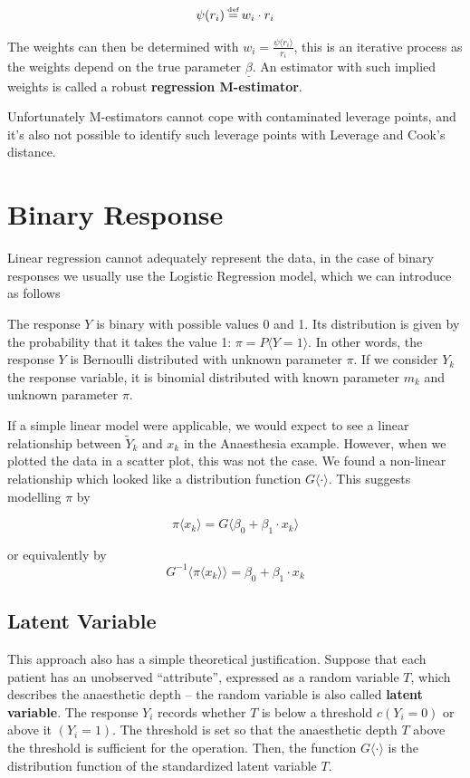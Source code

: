 \documentclass[11pt]{article}
\newcommand\defeq{\mathrel{\overset{\makebox[0pt]{\mbox{\normalfont\tiny def}}}{=}}}
\begin{document}
\begin{equation*}
	\psi(r_i) \defeq w_i \cdot r_i
\end{equation*}

\noindent
The weights can then be determined with $w_i = \frac{\psi\langle r_i \rangle}{r_i}$, this is an iterative process as the weights depend on the true parameter $\underline{\beta}$. An estimator with such implied weights is called a robust \textbf{regression M-estimator}.

\noindent
Unfortunately M-estimators cannot cope with contaminated leverage points, and it's also not possible to identify such leverage points with Leverage and Cook's distance.

\section{Binary Response}

Linear regression cannot adequately represent the data, in the case of binary responses we usually use the Logistic Regression model, which we can introduce as follows

\begin{theorem}
	The response $Y$ is binary with possible values 0 and 1. Its distribution is given by the probability that it takes the value 1: $ \pi = P\langle Y = 1 \rangle$. In other words, the response $Y$ is Bernoulli distributed with unknown parameter $\pi$. If we consider $Y_k$ the response variable, it is binomial distributed with known parameter $m_k$ and unknown parameter $\pi$.
\end{theorem}

If a simple linear model were applicable, we would expect to see a linear relationship between $\tilde{Y}_k$ and $x_k$ in the Anaesthesia example. However, when we plotted the data in a scatter plot, this was not the case. We found a non-linear relationship which looked like a distribution function $G\langle \cdot \rangle$. This suggests modelling $\pi$ by

\begin{equation*}
	\pi\langle x_k \rangle = G\langle \beta_0 + \beta_1 \cdot x_k \rangle
\end{equation*}

\noindent
or equivalently by
\begin{equation*}
	G^{-1}\langle\pi\langle x_k \rangle\rangle = \beta_0 + \beta_1 \cdot x_k
\end{equation*}

\subsection{Latent Variable}
This approach also has a simple theoretical justification. Suppose that each patient has an unobserved “attribute”, expressed as a random variable $T$, which describes the anaesthetic depth – the random variable is also called \textbf{latent variable}. The response $Y_i$ records whether $T$ is below a threshold $c (Y_i = 0)$ or above it $(Y_i = 1)$. The threshold is set so that the anaesthetic depth $T$ above the threshold is sufficient for the operation. Then, the function $G\langle \cdot \rangle$ is the distribution function of the standardized latent variable $T$.
\end{document}
